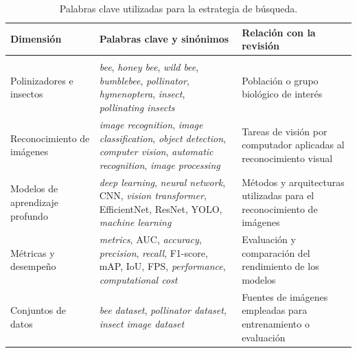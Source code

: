 \begin{xltabular}{\textwidth}{
    >{\raggedright\arraybackslash}p{3.0cm}
    >{\raggedright\arraybackslash}X
    >{\raggedright\arraybackslash}p{4.0cm}
}
\caption{Palabras clave utilizadas para la estrategia de búsqueda.}
\label{tab:palabras-clave-busqueda} \\

\hline
\textbf{Dimensión} &
\textbf{Palabras clave y sinónimos} &
\textbf{Relación con la revisión} \\
\hline
\endfirsthead

\endhead

\hline
\endfoot

\hline
{} \\
\endlastfoot

Polinizadores e insectos &
\textit{bee}, \textit{honey bee}, \textit{wild bee}, \textit{bumblebee}, \textit{pollinator}, \textit{hymenoptera}, \textit{insect}, \textit{pollinating insects} &
Población o grupo biológico de interés \\

Reconocimiento de imágenes &
\textit{image recognition}, \textit{image classification}, \textit{object detection}, \textit{computer vision}, \textit{automatic recognition}, \textit{image processing} &
Tareas de visión por computador aplicadas al reconocimiento visual \\

Modelos de aprendizaje profundo &
\textit{deep learning}, \textit{neural network}, CNN, \textit{vision transformer}, EfficientNet, ResNet, YOLO, \textit{machine learning} &
Métodos y arquitecturas utilizadas para el reconocimiento de imágenes \\

Métricas y desempeño &
\textit{metrics}, AUC, \textit{accuracy}, \textit{precision}, \textit{recall}, F1-score, mAP, IoU, FPS, \textit{performance}, \textit{computational cost} &
Evaluación y comparación del rendimiento de los modelos \\

Conjuntos de datos &
\textit{bee dataset}, \textit{pollinator dataset}, \textit{insect image dataset} &
Fuentes de imágenes empleadas para entrenamiento o evaluación \\

\end{xltabular}

